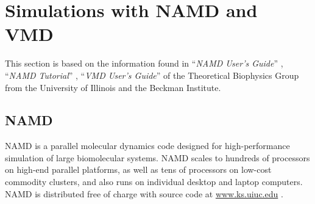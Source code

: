 \section{Simulations with NAMD and VMD}\label{sec:software}
This section is based on the information found in ``\textit{NAMD User's Guide}'' \cite{ref:NAMD_ug}, ``\textit{NAMD Tutorial}'' \cite{ref:NAMD_tutorial}, ``\textit{VMD User's Guide}'' \cite{ref:VMD_ug} of the Theoretical Biophysics Group from the University of Illinois and the Beckman Institute.

\subsection{NAMD}\label{ssec:NAMD-expl}
NAMD is a parallel molecular dynamics code designed for high-performance simulation of large biomolecular systems. NAMD scales to hundreds of processors on high-end parallel platforms, as well as tens of processors on low-cost commodity clusters, and also runs on individual desktop and laptop computers. NAMD is distributed free of charge with source code at \url{www.ks.uiuc.edu} \cite{ref:NAMD}.

